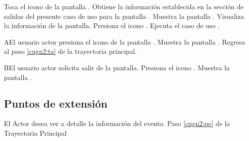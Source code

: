  \begin{UCtrayectoria}
    \UCpaso[\UCactor]  Toca el icono \btnDetalle de la pantalla . 
    \UCpaso[\UCsist] Obtiene la información establecida en la sección de salidas del presente caso de uso para la pantalla .
    \UCpaso[\UCsist] Muestra la pantalla  .
    \UCpaso[\UCactor] Visualiza la información de la pantalla. \label{cugn2:ta} 
    \UCpaso[\UCactor] Presiona el icono \btnDetalles. 
    \UCpaso[\UCsist] Ejecuta el caso de uso .\label{cugn2:pe}

 \end{UCtrayectoria}

\begin{UCtrayectoriaA}{A}{El usuario actor presiona el icono \btnDetalle de la pantalla . }
    \UCpaso[\UCsist] Muestra la pantalla  .
	\UCpaso[\UCsist] Regresa al paso \ref{cugn2:ta} de la trayectoria principal.
\end{UCtrayectoriaA}


\begin{UCtrayectoriaA}{B}{El usuario actor solicita salir de la pantalla.}
	\UCpaso[\UCactor] Presiona el icono \btnRegresar.
	\UCpaso[\UCsist] Muestra la pantalla  .
\end{UCtrayectoriaA}

\subsection{Puntos de extensión}

\UCExtensionPoint
{El Actor desea ver a detalle la información del evento.}
{ Paso \ref{cugn2:pe} de la Trayectoria Principal}
{}

